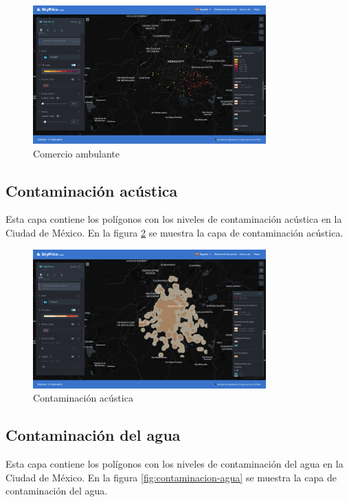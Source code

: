 \begin{figure}[H]
    \centering
    \includegraphics[width=0.8\textwidth]{imagenes/05-mapa-interactivo/comercio-ambulante.png}
    \caption{Comercio ambulante}
    \label{fig:comercio-ambulante}
\end{figure}

\subsection{Contaminación acústica}
Esta capa contiene los polígonos con los niveles de contaminación acústica en la
Ciudad de México. En la figura \ref{fig:contaminacion-acustica} se muestra la capa
de contaminación acústica.

\begin{figure}[H]
    \centering
    \includegraphics[width=0.8\textwidth]{imagenes/05-mapa-interactivo/contaminacion-acustica.png}
    \caption{Contaminación acústica}
    \label{fig:contaminacion-acustica}
\end{figure}

\subsection{Contaminación del agua}
Esta capa contiene los polígonos con los niveles de contaminación del agua en la
Ciudad de México. En la figura \ref{fig:contaminacion-agua} se muestra la capa de
contaminación del agua.

